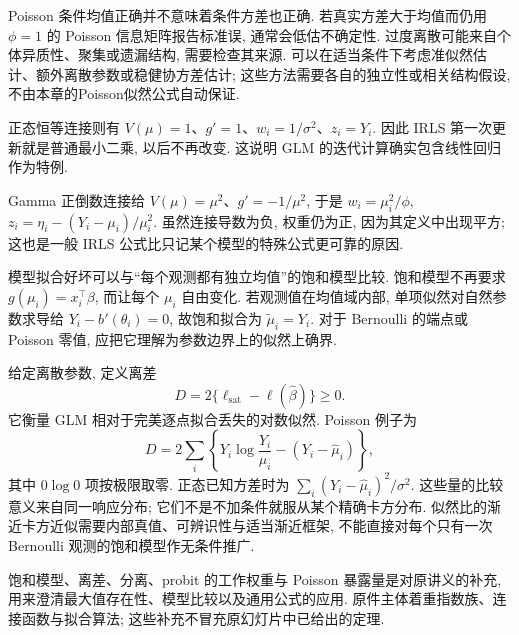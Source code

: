 Poisson 条件均值正确并不意味着条件方差也正确. 若真实方差大于均值而仍用 $\phi=1$ 的 Poisson 信息矩阵报告标准误, 通常会低估不确定性. 过度离散可能来自个体异质性、聚集或遗漏结构, 需要检查其来源. 可以在适当条件下考虑准似然估计、额外离散参数或稳健协方差估计; 这些方法需要各自的独立性或相关结构假设, 不由本章的Poisson似然公式自动保证.

正态恒等连接则有 $V(\mu)=1$、$g'=1$、$w_i=1/\sigma^2$、$z_i=Y_i$. 因此 IRLS 第一次更新就是普通最小二乘, 以后不再改变. 这说明 GLM 的迭代计算确实包含线性回归作为特例. 

Gamma 正倒数连接给 $V(\mu)=\mu^2$、$g'=-1/\mu^2$, 于是 $w_i=\mu_i^2/\phi$, $z_i=\eta_i-(Y_i-\mu_i)/\mu_i^2$. 虽然连接导数为负, 权重仍为正, 因为其定义中出现平方; 这也是一般 IRLS 公式比只记某个模型的特殊公式更可靠的原因. 

模型拟合好坏可以与“每个观测都有独立均值”的饱和模型比较. 饱和模型不再要求 $g(\mu_i)=x_i^\top\beta$, 而让每个 $\mu_i$ 自由变化. 若观测值在均值域内部, 单项似然对自然参数求导给 $Y_i-b'(\theta_i)=0$, 故饱和拟合为 $\widetilde\mu_i=Y_i$. 对于 Bernoulli 的端点或 Poisson 零值, 应把它理解为参数边界上的似然上确界. 

给定离散参数, 定义离差
\[
 D=2\{\ell_{\mathrm{sat}}-\ell(\widehat\beta)\}\geq0.
\]
它衡量 GLM 相对于完美逐点拟合丢失的对数似然. Poisson 例子为
\[
 D=2\sum_i\left\{Y_i\log\frac{Y_i}{\widehat\mu_i}-(Y_i-\widehat\mu_i)\right\},
\]
其中 $0\log0$ 项按极限取零. 正态已知方差时为 $\sum_i(Y_i-\widehat\mu_i)^2/\sigma^2$. 这些量的比较意义来自同一响应分布; 它们不是不加条件就服从某个精确卡方分布. 似然比的渐近卡方近似需要内部真值、可辨识性与适当渐近框架, 不能直接对每个只有一次 Bernoulli 观测的饱和模型作无条件推广. 

\begin{remark}[补充范围]
饱和模型、离差、分离、probit 的工作权重与 Poisson 暴露量是对原讲义的补充, 用来澄清最大值存在性、模型比较以及通用公式的应用. 原件主体着重指数族、连接函数与拟合算法; 这些补充不冒充原幻灯片中已给出的定理. 
\end{remark}
